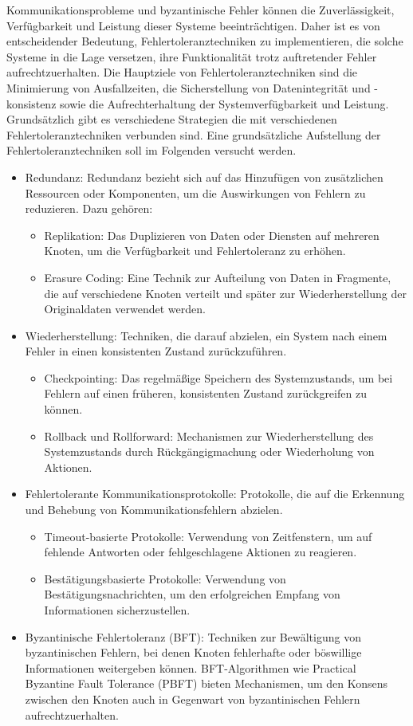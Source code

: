 Kommunikationsprobleme und byzantinische Fehler können die Zuverlässigkeit, Verfügbarkeit und Leistung dieser Systeme beeinträchtigen. Daher ist es von entscheidender Bedeutung, Fehlertoleranztechniken zu implementieren, die solche Systeme in die Lage versetzen, ihre Funktionalität trotz auftretender Fehler aufrechtzuerhalten. Die Hauptziele von Fehlertoleranztechniken sind die Minimierung von Ausfallzeiten, die Sicherstellung von Datenintegrität und -konsistenz sowie die Aufrechterhaltung der Systemverfügbarkeit und Leistung. Grundsätzlich gibt es verschiedene Strategien die mit verschiedenen Fehlertoleranztechniken verbunden sind. Eine grundsätzliche Aufstellung der Fehlertoleranztechniken soll im Folgenden versucht werden. 

\begin{itemize}
\item Redundanz: Redundanz bezieht sich auf das Hinzufügen von zusätzlichen Ressourcen oder Komponenten, um die Auswirkungen von Fehlern zu reduzieren. Dazu gehören:
\begin{itemize}
\item Replikation: Das Duplizieren von Daten oder Diensten auf mehreren Knoten, um die Verfügbarkeit und Fehlertoleranz zu erhöhen.
\item Erasure Coding: Eine Technik zur Aufteilung von Daten in Fragmente, die auf verschiedene Knoten verteilt und später zur Wiederherstellung der Originaldaten verwendet werden.
\end{itemize}
\item Wiederherstellung: Techniken, die darauf abzielen, ein System nach einem Fehler in einen konsistenten Zustand zurückzuführen.
\begin{itemize}
\item Checkpointing: Das regelmäßige Speichern des Systemzustands, um bei Fehlern auf einen früheren, konsistenten Zustand zurückgreifen zu können.
\item Rollback und Rollforward: Mechanismen zur Wiederherstellung des Systemzustands durch Rückgängigmachung oder Wiederholung von Aktionen.
\end{itemize}
\item Fehlertolerante Kommunikationsprotokolle: Protokolle, die auf die Erkennung und Behebung von Kommunikationsfehlern abzielen.
\begin{itemize}
\item Timeout-basierte Protokolle: Verwendung von Zeitfenstern, um auf fehlende Antworten oder fehlgeschlagene Aktionen zu reagieren.
\item Bestätigungsbasierte Protokolle: Verwendung von Bestätigungsnachrichten, um den erfolgreichen Empfang von Informationen sicherzustellen.
\end{itemize}
\item Byzantinische Fehlertoleranz (BFT): Techniken zur Bewältigung von byzantinischen Fehlern, bei denen Knoten fehlerhafte oder böswillige Informationen weitergeben können. BFT-Algorithmen wie Practical Byzantine Fault Tolerance (PBFT) bieten Mechanismen, um den Konsens zwischen den Knoten auch in Gegenwart von byzantinischen Fehlern aufrechtzuerhalten.
\end{itemize}
